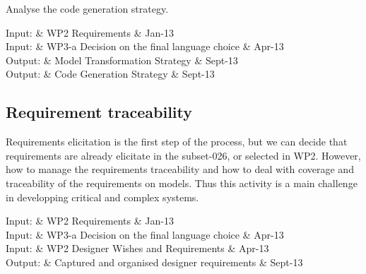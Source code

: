 \documentclass{template/openetcs_article}
\begin{document}
Analyse the code generation strategy.



%

\begin{inoutput}
Input: & WP2 Requirements & Jan-13 \\
\hline
Input: & WP3-a  Decision on the final language choice & Apr-13 \\
\hline
Output: & Model Transformation Strategy & Sept-13 \\
\hline
Output: & Code Generation Strategy & Sept-13 \\
\end{inoutput}


\subsection{Requirement traceability}

Requirements elicitation is the first step of the process, but we can decide that requirements are already elicitate in the subset-026, or selected in WP2. However, how to manage the requirements traceability and how to deal with coverage and traceability of the requirements on models. Thus this activity is a main challenge in developping critical and complex systems.

\begin{inoutput}
Input: & WP2 Requirements & Jan-13 \\
\hline
Input: & WP3-a  Decision on the final language choice & Apr-13 \\
\hline
Input: & WP2 Designer Wishes and Requirements & Apr-13 \\
\hline
Output: & Captured and organised designer requirements & Sept-13 \\
\end{inoutput}
\end{document}
